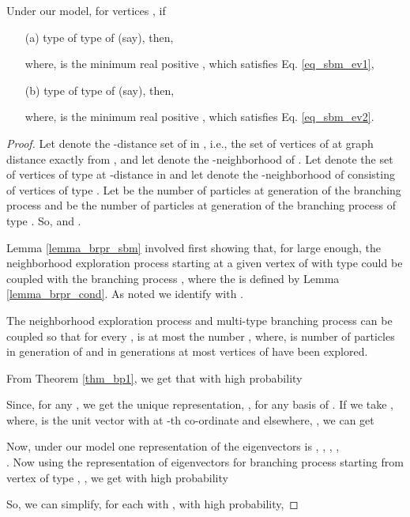 \documentclass[graybox]{svmult}
\begin{document}
\begin{lemma}
\label{lm_low_bnd}
Under our model, for vertices , if 
\begin{itemize}
\item[(a)] \hspace{0.05in} type of  type of  (say), then, 

where,  is the minimum real positive , which satisfies Eq. \eqref{eq_sbm_ev1},
\item[(b)] \hspace{0.05in} type of   type of  (say), then, 

where,  is the minimum real positive , which satisfies Eq. \eqref{eq_sbm_ev2}.
\end{itemize}
\end{lemma}
\begin{proof}
Let  denote the -distance set of  in , i.e., the set of vertices of  at graph distance exactly  from , and let  denote the -neighborhood  of . Let  denote the set of vertices of type  at -distance in  and let  denote the -neighborhood  of  consisting of vertices of type . Let  be the number of particles at generation  of the branching process  and  be the number of particles at generation  of the branching process  of type . So,  and .

Lemma \ref{lemma_brpr_sbm} involved first showing that, for  large enough, the neighborhood exploration process starting at a given vertex  of  with type  could be coupled with the branching process , where the  is defined by Lemma \ref{lemma_brpr_cond}. As noted we identify  with . 

The neighborhood exploration process and multi-type branching process can be coupled so that for every ,  is at most the number , where,  is number of particles in generation  of  and in  generations at most  vertices of  have been explored. 


From Theorem \ref{thm_bp1}, we get that with high probability

Since, for any , we get the unique representation, , for any basis  of . If we take , where,  is the unit vector with  at -th co-ordinate and  elsewhere, , we can get

Now, under our model one representation of the eigenvectors is , , , , \\ .
Now using the representation of eigenvectors for branching process starting from vertex of type , , we get with high probability

So, we can simplify, for each  with , with high probability,






\end{proof}
\end{document}

